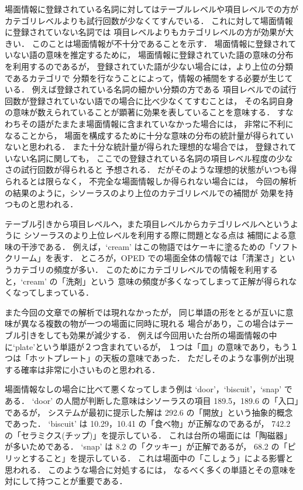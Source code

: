 場面情報に登録されている名詞に対してはテーブルレベルや項目レベルでの方が
カテゴリレベルよりも試行回数が少なくてすんでいる．
これに対して場面情報に登録されていない名詞では
項目レベルよりもカテゴリレベルの方が効果が大きい．
このことは場面情報が不十分であることを示す．
場面情報に登録されていない語の意味を推定するために，
場面情報に登録されていた語の意味の分布を利用するのであるが，
登録されていた語が少ない場合には，より上位の分類であるカテゴリで
分類を行なうことによって，情報の補間をする必要が生じている．
例えば登録されている名詞の細かい分類の方である
項目レベルでの試行回数が登録されていない語での場合に比べ少なくてすむことは，
その名詞自身の意味が数えられていることが顕著に効果を表していることを意味する．
すなわちその語がたまたま場面情報に含まれていなかった場合には，
非常に不利になることから，
場面を構成するために十分な意味の分布の統計量が得られていないと思われる．
また十分な統計量が得られた理想的な場合では，
登録されていない名詞に関しても，
ここでの登録されている名詞の項目レベル程度の少なさの試行回数が得られると
予想される．
だがそのような理想的状態がいつも得られるとは限らなく，
不完全な場面情報しか得られない場合には，
今回の解析の結果のように，シソーラスのより上位のカテゴリレベルでの補間が
効果を持つものと思われる．

テーブル引きから項目レベルへ，また項目レベルからカテゴリレベルへというように
シソーラスのより上位レベルを利用する際に問題となる点は
補間による意味の干渉である．
例えば，`cream' はこの物語ではケーキに塗るための「ソフトクリーム」を表す．
ところが，OPED での場面全体の情報では「清潔さ」というカテゴリの頻度が多い．
このためにカテゴリレベルでの情報を利用すると，`cream' の「洗剤」という
意味の頻度が多くなってしまって正解が得られなくなってしまっている．

また今回の文章での解析では現れなかったが，
同じ単語の形をとるが互いに意味が異なる複数の物が一つの場面に同時に現れる
場合があり，この場合はテーブル引きをしても効果が減少する．
例えば今回用いた台所の場面情報の中に`plate'という単語が２つ含まれているが，
１つは「皿」の意味であり，もう１つは「ホットプレート」の天板の意味であった．
ただしそのような事例が出現する確率は非常に小さいものと思われる．

場面情報なしの場合に比べて悪くなってしまう例は
`door'，`biscuit'，`snap' である．
`door' の人間が判断した意味はシソーラスの項目 189.5，189.6 の「入口」であるが，
システムが最初に提示した解は 292.6 の「開放」という抽象的概念であった．
`biscuit' は 10.29，10.41 の「食べ物」が正解なのであるが，
742.2 の「セラミクス(チップ)」を提示している．
これは台所の場面には「陶磁器」が多いためである．
`snap' は 8.2 の「クッキー」が正解であるが，
68.2 の「ピリッとすること」を提示している．
これは場面中の「こしょう」による影響と思われる．
このような場合に対処するには，
なるべく多くの単語とその意味を対にして持つことが重要である．

